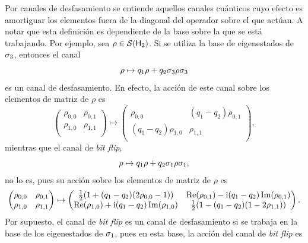 Por canales de desfasamiento se entiende aquellos canales cuánticos cuyo efecto es amortiguar los elementos fuera de la diagonal del operador sobre el que actúan. A notar que esta definición es dependiente de la base sobre la que se está trabajando. Por ejemplo, sea $\rho\in\mathcal{S}({\sf H}_{2})$. Si se utiliza la base de eigenestados de $\sigma_{3}$, entonces el canal
\begin{equation}
    \rho\mapsto q_{1}\rho + q_{2} \sigma_{3}\rho\sigma_{3}\nonumber
\end{equation}
es un canal de desfasamiento. En efecto, la acción de este canal sobre los elementos de matriz de $\rho$ es
\begin{equation}
    \begin{pmatrix}
        \rho_{0,0} & \rho_{0,1}\\
        \rho_{1,0} & \rho_{1,1}\\
    \end{pmatrix}\mapsto\begin{pmatrix}
        \rho_{0,0} & (q_{1}-q_{2})\rho_{0,1}\\
        (q_{1}-q_{2})\rho_{1,0} & \rho_{1,1}\\
    \end{pmatrix},\nonumber
\end{equation}
mientras que el canal de \textit{bit flip},
\begin{equation}
    \rho\mapsto q_{1}\rho + q_{2} \sigma_{1}\rho\sigma_{1},\nonumber
\end{equation}
no lo es, pues su acción sobre los elementos de matriz de $\rho$ es
\begin{equation}
    \begin{pmatrix}
        \rho_{0,0} & \rho_{0,1}\\
        \rho_{1,0} & \rho_{1,1}\\
    \end{pmatrix}\mapsto\begin{pmatrix}
        \frac{1}{2}\qty(1+(q_{1}-q_{2})(2\rho_{0,0}-1)) & \Re(\rho_{0,1})-\text{i}(q_{1}-q_{2})\Im(\rho_{0,1})\\
        \Re(\rho_{1,0})+\text{i}(q_{1}-q_{2})\Im(\rho_{1,0}) & \frac{1}{2}\qty(1-(q_{1}-q_{2})(1-2\rho_{1,1}))\\
    \end{pmatrix}.\nonumber
\end{equation}
Por supuesto, el canal de \textit{bit flip} es un canal de desfasamiento si se trabaja en la base de los eigenestados de $\sigma_{1}$, pues en esta base, la acción del canal de \textit{bit flip} es
